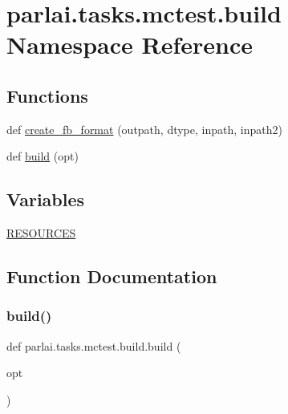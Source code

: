 \hypertarget{namespaceparlai_1_1tasks_1_1mctest_1_1build}{}\section{parlai.\+tasks.\+mctest.\+build Namespace Reference}
\label{namespaceparlai_1_1tasks_1_1mctest_1_1build}
\subsection*{Functions}
\begin{DoxyCompactItemize}
\item 
def \hyperlink{namespaceparlai_1_1tasks_1_1mctest_1_1build_a7d827f19f83b7d60f4ed1dbabade06cf}{create\+\_\+fb\+\_\+format} (outpath, dtype, inpath, inpath2)
\item 
def \hyperlink{namespaceparlai_1_1tasks_1_1mctest_1_1build_aed15e288ff3209606d79f5cbfee86b5a}{build} (opt)
\end{DoxyCompactItemize}
\subsection*{Variables}
\begin{DoxyCompactItemize}
\item 
\hyperlink{namespaceparlai_1_1tasks_1_1mctest_1_1build_a388900d6870ee80c4977f22e1782037f}{R\+E\+S\+O\+U\+R\+C\+ES}
\end{DoxyCompactItemize}


\subsection{Function Documentation}
\mbox{\label{namespaceparlai_1_1tasks_1_1mctest_1_1build_aed15e288ff3209606d79f5cbfee86b5a}} 
\subsubsection{\texorpdfstring{build()}{build()}}
{\footnotesize\ttfamily def parlai.\+tasks.\+mctest.\+build.\+build (\begin{DoxyParamCaption}\item[{}]{opt }\end{DoxyParamCaption})}



